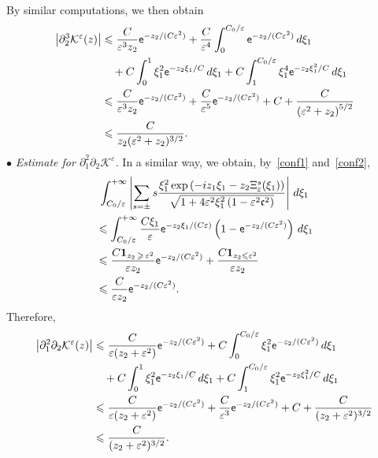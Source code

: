 \documentclass[AHL,Unicode,longabstracts,published]{cedram}
\newcommand*\p{\partial}
\newcommand*\BK{\mathcal{K}}
\newcommand{\bfun}{\mathbf{1}}
\newcommand*\ex{{\sf e}}
\newcommand*\cs{{\mathfrak c}}
\newcommand*\ii{\infty}
\newcommand*\gs{\geqslant }
\newcommand*\ls{\leqslant }
\newcommand*\e{\varepsilon}
\begin{document}
By similar computations, we then obtain
\begin{align*}
\left\lvert \p_2^3 \BK^\e (z) \right\rvert &
\ls \frac{C}{\e^3 z_2 } \ex^{ - z_2 / (C\e^2) } + \frac{ C}{\e^4} \int_0^{ C_0 / \e } \ex^{- z_2 / (C \e^2) } \, d\xi_1\\ 
& \quad + C \int_0^{1} \xi_1^2 \ex^{- z_2 \xi_1 / C } \, d\xi_1 + C \int_1^{ C_0 / \e } \xi_1^4 \ex^{- z_2 \xi_1^2 / C } \, d\xi_1
\\ &
\ls \frac{C}{\e^3 z_2 } \ex^{ - z_2 / (C\e^2) } + \frac{C}{\e^5} \ex^{- z_2 / (C \e^2) } + C + \frac{C}{\left(\e^2 + z_2\right)^{5/2} }
\\ &
\ls \frac{C}{ z_2 (\e^2 + z_2)^{3/2}}.
\end{align*}
$ \bullet $ \emph{Estimate for $ \p_1^2 \p_2 \BK^\e $.} In a similar way, we obtain, by~\eqref{conf1} and~\eqref{conf2},
\begin{multline*}
\int_{ C_0 / \e }^{+\ii}  \left\lvert \sum_{ s = \pm} s
\frac{ \xi_1^2 \exp\left(- iz_1 \xi_1 - z_2 \Xi_\e^s (\xi_1)\right)}{\sqrt{1 + 4 \e^2 \xi_1^2 \left(1 - \e^2 \cs^2\right)}} \right\rvert \, d\xi_1
\\
\begin{aligned}
& \ls \int_{ C_0 / \e }^{+\ii} \frac{ C\xi_1 }{ \e } \ex^{ - z_2 \xi_1/ (C\e) } \left(1 - \ex^{ - z_2 /(C\e^2) }\right) \, d\xi_1
\\ &
\ls \frac{C \bfun_{z_2\,\gs\,\e^2 } }{ \e z_2 } \ex^{ - z_2 / (C\e^2) } + \frac{C \bfun_{z_2 \ls \e^2 } }{ \e z_2 }
\\ &
\ls \frac{ C}{\e z_2 } \ex^{ - z_2 /(C\e^2) }.
\end{aligned}
\end{multline*}
Therefore,
\begin{align*}
\left\lvert \p_1^2 \p_2 \BK^\e (z) \right\rvert &
\ls \frac{ C}{\e (z_2 + \e^2) } \ex^{ - z_2 /(C\e^2) } + C \int_0^{ C_0 /\e } \xi_1^2 \ex^{- z_2 / (C \e^2) } \, d\xi_1
\\ & \quad + C \int_0^{1} \xi_1^2 \ex^{- z_2 \xi_1 / C } \, d\xi_1 + C \int_1^{ C_0 / \e } \xi_1^2 \ex^{- z_2 \xi_1^2 / C } \, d\xi_1
\\ &
\ls \frac{ C}{\e (z_2 + \e^2) } \ex^{ - z_2 /(C\e^2) } + \frac{C}{\e^3} \ex^{- z_2 / (C \e^2) } + C + \frac{C}{ (z_2 + \e^2)^{3/2} }
\\ &
\ls \frac{C}{ (z_2 + \e^2)^{3/2} }.
\end{align*}
\end{document}

